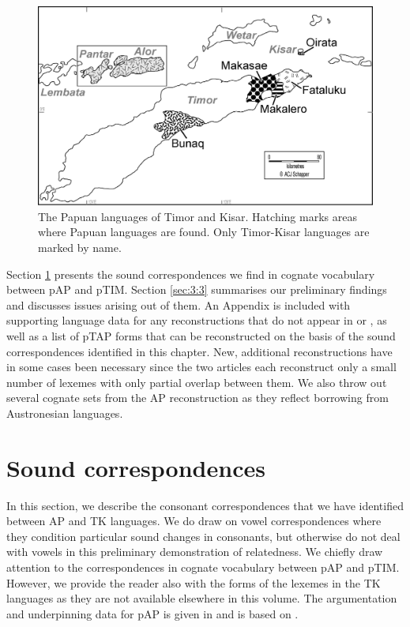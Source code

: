 \begin{figure}
\includegraphics[width=\textwidth]{figures/ch3_map.png}
\caption[The Papuan languages of Timor and Kisar]{The Papuan languages of Timor and Kisar. Hatching marks areas where Papuan languages are found. Only Timor-Kisar languages are marked by name.}
\end{figure}

Section \ref{sec:3:2} presents the sound correspondences we find in cognate vocabulary between pAP and pTIM. Section \ref{sec:3:3} summarises our preliminary findings and discusses issues arising out of them. An Appendix is included with supporting language data for any reconstructions that do not appear in \citet{HoltonEtAl2012} or \citet{SchapperEtAl2012}, as well as a list of pTAP forms that can be reconstructed on the basis of the sound correspondences identified in this chapter. New, additional reconstructions have in some cases been necessary since the two articles each reconstruct only a small number of lexemes with only partial overlap between them. We also throw out several cognate sets from the AP reconstruction as they reflect borrowing from Austronesian languages. 

\section{Sound correspondences}\label{sec:3:2}
In this section, we describe the consonant correspondences that we have identified between AP and TK languages. We do draw on vowel correspondences where they condition particular sound changes in consonants, but otherwise do not deal with vowels in this preliminary demonstration of relatedness. We chiefly draw attention to the correspondences in cognate vocabulary between pAP and pTIM. However, we provide the reader also with the forms of the lexemes in the TK languages as they are not available elsewhere in this volume. The argumentation and underpinning data for pAP is given in \citet{HoltonRobinsonTV} and is based on \citet{HoltonEtAl2012}.

